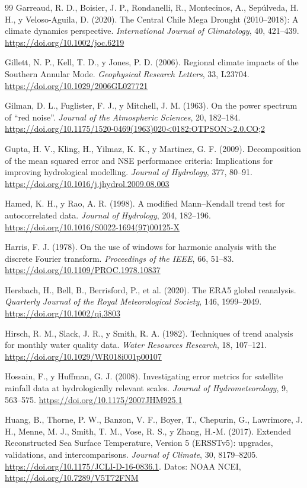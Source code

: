 \documentclass[11pt,a4paper]{article}
\begin{document}
\begin{thebibliography}{99}
 Garreaud, R. D., Boisier, J. P., Rondanelli, R., Montecinos, A., Sepúlveda, H. H., y Veloso-Aguila, D. (2020). The Central Chile Mega Drought (2010--2018): A climate dynamics perspective. \emph{International Journal of Climatology}, 40, 421--439. \url{https://doi.org/10.1002/joc.6219}

 Gillett, N. P., Kell, T. D., y Jones, P. D. (2006). Regional climate impacts of the Southern Annular Mode. \emph{Geophysical Research Letters}, 33, L23704. \url{https://doi.org/10.1029/2006GL027721}

 Gilman, D. L., Fuglister, F. J., y Mitchell, J. M. (1963). On the power spectrum of ``red noise''. \emph{Journal of the Atmospheric Sciences}, 20, 182--184. \url{https://doi.org/10.1175/1520-0469(1963)020<0182:OTPSON>2.0.CO;2}

 Gupta, H. V., Kling, H., Yilmaz, K. K., y Martinez, G. F. (2009). Decomposition of the mean squared error and NSE performance criteria: Implications for improving hydrological modelling. \emph{Journal of Hydrology}, 377, 80--91. \url{https://doi.org/10.1016/j.jhydrol.2009.08.003}

 Hamed, K. H., y Rao, A. R. (1998). A modified Mann--Kendall trend test for autocorrelated data. \emph{Journal of Hydrology}, 204, 182--196. \url{https://doi.org/10.1016/S0022-1694(97)00125-X}

 Harris, F. J. (1978). On the use of windows for harmonic analysis with the discrete Fourier transform. \emph{Proceedings of the IEEE}, 66, 51--83. \url{https://doi.org/10.1109/PROC.1978.10837}

 Hersbach, H., Bell, B., Berrisford, P., et al. (2020). The ERA5 global reanalysis. \emph{Quarterly Journal of the Royal Meteorological Society}, 146, 1999--2049. \url{https://doi.org/10.1002/qj.3803}

 Hirsch, R. M., Slack, J. R., y Smith, R. A. (1982). Techniques of trend analysis for monthly water quality data. \emph{Water Resources Research}, 18, 107--121. \url{https://doi.org/10.1029/WR018i001p00107}

 Hossain, F., y Huffman, G. J. (2008). Investigating error metrics for satellite rainfall data at hydrologically relevant scales. \emph{Journal of Hydrometeorology}, 9, 563--575. \url{https://doi.org/10.1175/2007JHM925.1}

 Huang, B., Thorne, P. W., Banzon, V. F., Boyer, T., Chepurin, G., Lawrimore, J. H., Menne, M. J., Smith, T. M., Vose, R. S., y Zhang, H.-M. (2017). Extended Reconstructed Sea Surface Temperature, Version 5 (ERSSTv5): upgrades, validations, and intercomparisons. \emph{Journal of Climate}, 30, 8179--8205. \url{https://doi.org/10.1175/JCLI-D-16-0836.1}. Datos: NOAA NCEI, \url{https://doi.org/10.7289/V5T72FNM}


\end{thebibliography}
\end{document}
